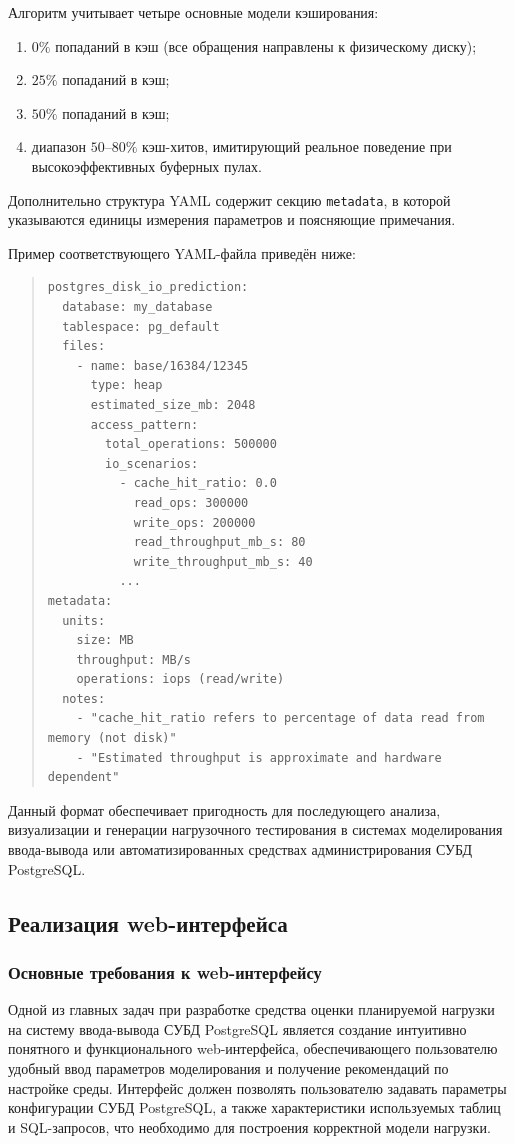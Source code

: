 Алгоритм учитывает четыре основные модели кэширования:
\begin{enumerate}
    \item $0\%$ попаданий в кэш (все обращения направлены к физическому диску);
    \item $25\%$ попаданий в кэш;
    \item $50\%$ попаданий в кэш;
    \item диапазон $50\text{--}80\%$ кэш-хитов, имитирующий реальное поведение при высокоэффективных буферных пулах.
\end{enumerate}

Дополнительно структура YAML содержит секцию \texttt{metadata}, в которой указываются единицы измерения параметров и поясняющие примечания.

Пример соответствующего YAML-файла приведён ниже:
\begin{quote}
\footnotesize
\begin{verbatim}
postgres_disk_io_prediction:
  database: my_database
  tablespace: pg_default
  files:
    - name: base/16384/12345
      type: heap
      estimated_size_mb: 2048
      access_pattern:
        total_operations: 500000
        io_scenarios:
          - cache_hit_ratio: 0.0
            read_ops: 300000
            write_ops: 200000
            read_throughput_mb_s: 80
            write_throughput_mb_s: 40
          ...
metadata:
  units:
    size: MB
    throughput: MB/s
    operations: iops (read/write)
  notes:
    - "cache_hit_ratio refers to percentage of data read from memory (not disk)"
    - "Estimated throughput is approximate and hardware dependent"
\end{verbatim}
\end{quote}

Данный формат обеспечивает пригодность для последующего анализа, визуализации и генерации нагрузочного тестирования в системах моделирования ввода-вывода или автоматизированных средствах администрирования СУБД PostgreSQL.




\subsection{Реализация web-интерфейса}
\subsubsection{Основные требования к web-интерфейсу}

Одной из главных задач при разработке средства оценки пла\-ни\-руемой наг\-руз\-ки на систему ввода-вывода СУБД PostgreSQL является создание интуитивно понятного и функционального web-интерфейса, обеспечивающего пользователю удобный ввод параметров моделирования и получение рекомендаций по настройке среды. Интерфейс должен позволять пользователю задавать параметры конфигурации СУБД PostgreSQL, а также характеристики используемых таблиц и SQL-запросов, что необходимо для построения корректной модели нагрузки.



